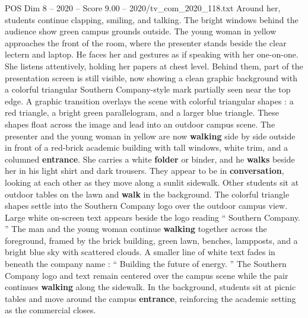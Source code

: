\begin{textsample}{POS Dim 8 – 2020 – Score 9.00 – 2020/tv\_com\_2020\_118.txt}
Around her, students continue clapping, smiling, and talking.
The bright windows behind the audience show green campus grounds outside.
The young woman in yellow approaches the front of the room, where the presenter stands beside the clear lectern and laptop.
He faces her and gestures as if speaking with her one-on-one.
She listens attentively, holding her papers at chest level.
Behind them, part of the presentation screen is still visible, now showing a clean graphic background with a colorful triangular Southern Company-style mark partially seen near the top edge.
A graphic transition overlays the scene with colorful triangular shapes : a red triangle, a bright green parallelogram, and a larger blue triangle.
These shapes float across the image and lead into an outdoor campus scene.
The presenter and the young woman in yellow are now \textbf{walking} side by side outside in front of a red-brick academic building with tall windows, white trim, and a columned \textbf{entrance}.
She carries a white \textbf{folder} or binder, and he \textbf{walks} beside her in his light shirt and dark trousers.
They appear to be in \textbf{conversation}, looking at each other as they move along a sunlit sidewalk.
Other students sit at outdoor tables on the lawn and \textbf{walk} in the background.
The colorful triangle shapes settle into the Southern Company logo over the outdoor campus view.
Large white on-screen text appears beside the logo reading “ Southern Company. ” The man and the young woman continue \textbf{walking} together across the foreground, framed by the brick building, green lawn, benches, lampposts, and a bright blue sky with scattered clouds.
A smaller line of white text fades in beneath the company name : “ Building the future of energy. ” The Southern Company logo and text remain centered over the campus scene while the pair continues \textbf{walking} along the sidewalk.
In the background, students sit at picnic tables and move around the campus \textbf{entrance}, reinforcing the academic setting as the commercial closes.

\end{textsample}
